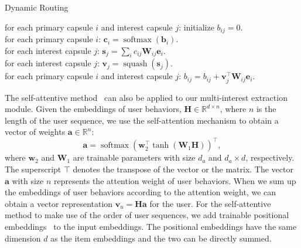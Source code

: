 

\begin{algorithm}[t]
	\caption{Dynamic Routing \label{algo:dynamic_routing}}
	for each primary capsule $i$ and interest capsule $j$: initialize $b_{ij} = 0$. \\
     {
        for each primary capsule $i$: $\mathbf{c}_i = \operatorname{softmax}(\mathbf{b}_{i})$.\\
        for each interest capsule $j$: $\mathbf{s}_j = \sum_{i} c_{ij}\mathbf{W}_{ij}\mathbf{e}_i$.\\%

        for each interest capsule $j$: $\mathbf{v}_j = \operatorname{squash}(\mathbf{s}_j)$. \\

        for each primary capsule $i$ and interest capsule $j$: $b_{ij} = b_{ij}+ \mathbf{v}_j^\top \mathbf{W}_{ij}\mathbf{e}_i$.
    }
\end{algorithm}


The self-attentive method~\cite{lin2017structured} can also be applied to our multi-interest extraction module. 
Given the embeddings of user behaviors, $\mathbf{H}\in \mathbb{R}^{d\times n}$, where $n$ is the length of the user sequence, we use the self-attention mechanism to obtain a vector of weights $\mathbf{a} \in \mathbb{R}^{n}$:
\begin{equation}
    \mathbf{a} = \operatorname{softmax}(\mathbf{w}_{2}^\top \operatorname{tanh}(\mathbf{W}_{1} \mathbf{H}))^\top,
\end{equation}
\noindent where $\mathbf{w}_{2}$ and $\mathbf{W}_{1}$ are trainable parameters with size $d_a$ and $d_a \times d$, respectively. The superscript $\top$ denotes the transpose of the vector or the matrix. The vector $\mathbf{a}$ with size $n$ represents the attention weight of user behaviors. When we sum up the embeddings of user behaviors according to the attention weight, we can obtain a vector representation $\mathbf{v}_u = \mathbf{H} \mathbf{a}$ for the user. For the self-attentive method to make use of the order of user sequences, we add trainable positional embeddings~\cite{vaswani2017attention} to the input embeddings. The positional embeddings have the same dimension $d$ as the item embeddings and the two can be directly summed. 

